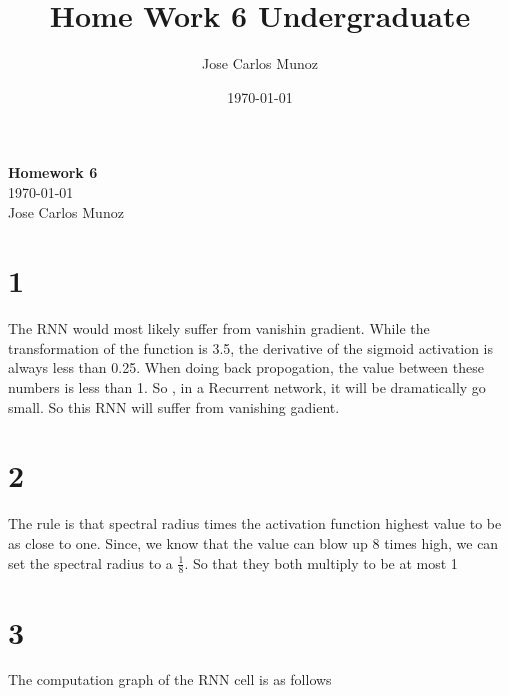 \documentclass[12pt,english]{article}
\title{Home Work 6 Undergraduate}
\date{\today}
\author{Jose Carlos Munoz}
\begin{document}
\begin{center}
    \Large
    \textbf{Homework 6}\\
    \small
    \today\\
    \large
    Jose Carlos Munoz
\end{center}
\section*{1}
The RNN would most likely suffer from vanishin gradient. While the transformation of the function is 3.5, the derivative of the sigmoid activation is always less than 0.25. When doing back propogation, the value between these numbers is less than 1. So , in a Recurrent network, it will be dramatically go small. So this RNN will suffer from vanishing gadient.
\section*{2}
The rule is that spectral radius times the activation function highest value to be as close to one. Since, we know that the value can blow up 8 times high, we can set the spectral radius to a $\frac{1}{8}$. So that they both multiply to be at most 1
\section*{3}
The computation graph of the RNN cell is as follows
\newcommand{\inputnum}{2}  
\newcommand{\hiddennum}{2}   
\newcommand{\outputnum}{1} 
\begin{center}
\end{center}
\end{document}
